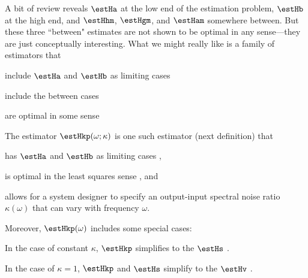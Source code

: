 A bit of review reveals $\estHa$ at the low end of the estimation problem,
$\estHb$ at the high end, and $\estHhm$, $\estHgm$, and $\estHam$
somewhere between.
But these three ``between" estimates are not shown to be optimal in any sense---they
are just conceptually interesting.
What we might really like is a family of estimators that
\begin{listi}
  \item include $\estHa$ and $\estHb$ as limiting cases
  \item include the between cases
  \item are optimal in some sense
\end{listi}
The estimator $\estHkp(\omega;\kappa)$ is one such estimator (next definition) that
\begin{listi}
  \item has $\estHa$ and $\estHb$ as limiting cases ,
  \item is optimal in the least squares sense , and
  \item allows for a system designer to specify an output-input spectral noise ratio $\kappa(\omega)$
        that can vary with frequency $\omega$.
\end{listi}

Moreover, $\estHkp(\omega)$ includes some special cases:
\begin{liste}
  \item In the case of constant $\kappa$, $\estHkp$ simplifies to
        the  $\estHs$ .
  \item In the case of $\kappa=1$, $\estHkp$ and $\estHs$ simplify to
        the  $\estHv$ .
\end{liste}

